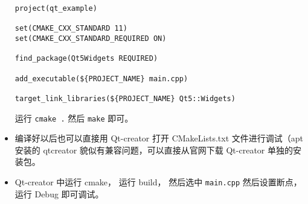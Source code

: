 \begin{itemize}
\begin{lstlisting}[language=none,caption=CMakeLists.txt]
project(qt_example)

set(CMAKE_CXX_STANDARD 11)
set(CMAKE_CXX_STANDARD_REQUIRED ON)

find_package(Qt5Widgets REQUIRED)

add_executable(${PROJECT_NAME} main.cpp)

target_link_libraries(${PROJECT_NAME} Qt5::Widgets)
\end{lstlisting}
运行 \verb|cmake .| 然后 \verb|make| 即可。
\item 编译好以后也可以直接用 Qt-creator 打开 CMakeLists.txt 文件进行调试（apt 安装的 qtcreator 貌似有兼容问题，可以直接从官网下载 Qt-creator 单独的安装包。
\item Qt-creator 中运行 cmake， 运行 build， 然后选中 \verb|main.cpp| 然后设置断点， 运行 Debug 即可调试。
\end{itemize}
